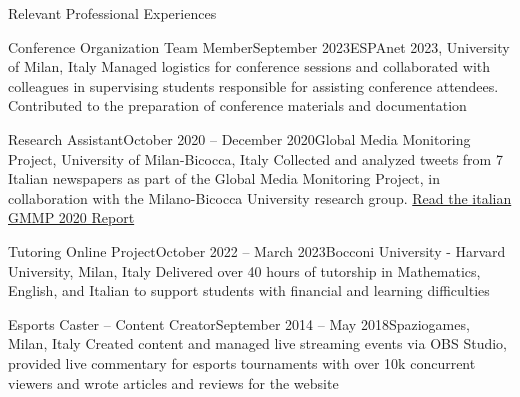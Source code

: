 \documentclass{cv} %
\begin{document}
\begin{rSection}{Relevant Professional Experiences}

    \subtitle{Academic}

    \begin{rExperienceSection}{Conference Organization Team Member}{September 2023}{ESPAnet 2023, University of Milan, Italy}
    Managed logistics for conference sessions and collaborated with colleagues in supervising students responsible for assisting conference attendees. Contributed to the preparation of conference materials and documentation
    \end{rExperienceSection}
    
    \begin{rExperienceSection}{Research Assistant}{October 2020 -- December 2020}{Global Media Monitoring Project, University of Milan-Bicocca, Italy}
    Collected and analyzed tweets from 7 Italian newspapers as part of the Global Media Monitoring Project, in collaboration with the Milano-Bicocca University research group. \href{https://www.osservatorio.it/wp-content/uploads/2016/03/GMMP-2020-Nationa-Report-Italy.pdf}{Read the italian GMMP 2020 Report}
    \end{rExperienceSection}
    
    \begin{rExperienceSection}{Tutoring Online Project}{October 2022 -- March 2023}{Bocconi University - Harvard University, Milan, Italy}
    Delivered over 40 hours of tutorship in Mathematics, English, and Italian to support students with financial and learning difficulties
    \end{rExperienceSection}
    
    \subtitle{Extra-Academic}
    
    \begin{rExperienceSection}{Esports Caster -- Content Creator}{September 2014 -- May 2018}{Spaziogames, Milan, Italy}
    Created content and managed live streaming events via OBS Studio, provided live commentary for esports tournaments with over 10k concurrent viewers and wrote articles and reviews for the website
    \end{rExperienceSection}

\end{rSection}
\end{document}
